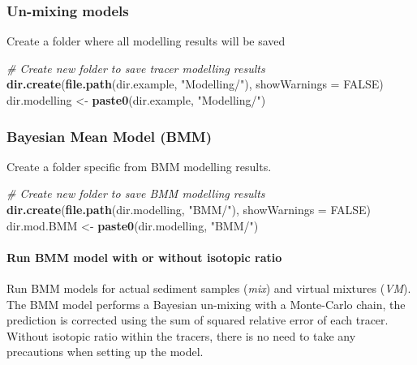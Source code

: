 \documentclass[
]{article}
\newenvironment{Shaded}{\begin{snugshade}}{\end{snugshade}}
\newcommand{\AttributeTok}[1]{\textcolor[rgb]{0.13,0.29,0.53}{#1}}
\newcommand{\CommentTok}[1]{\textcolor[rgb]{0.56,0.35,0.01}{\textit{#1}}}
\newcommand{\ConstantTok}[1]{\textcolor[rgb]{0.56,0.35,0.01}{#1}}
\newcommand{\FunctionTok}[1]{\textcolor[rgb]{0.13,0.29,0.53}{\textbf{#1}}}
\newcommand{\NormalTok}[1]{#1}
\newcommand{\OtherTok}[1]{\textcolor[rgb]{0.56,0.35,0.01}{#1}}
\newcommand{\StringTok}[1]{\textcolor[rgb]{0.31,0.60,0.02}{#1}}
\begin{document}
\hypertarget{un-mixing-models}{%
\subsubsection{Un-mixing models}\label{un-mixing-models}}

Create a folder where all modelling results will be saved

\begin{Shaded}
\begin{Highlighting}[]
\CommentTok{\# Create new folder to save tracer modelling results}
\FunctionTok{dir.create}\NormalTok{(}\FunctionTok{file.path}\NormalTok{(dir.example, }\StringTok{"Modelling/"}\NormalTok{), }\AttributeTok{showWarnings =} \ConstantTok{FALSE}\NormalTok{)}
\NormalTok{dir.modelling }\OtherTok{\textless{}{-}} \FunctionTok{paste0}\NormalTok{(dir.example, }\StringTok{"Modelling/"}\NormalTok{)}
\end{Highlighting}
\end{Shaded}

\hypertarget{bayesian-mean-model-bmm}{%
\subsubsection{Bayesian Mean Model
(BMM)}\label{bayesian-mean-model-bmm}}

Create a folder specific from BMM modelling results.

\begin{Shaded}
\begin{Highlighting}[]
\CommentTok{\# Create new folder to save BMM modelling results}
\FunctionTok{dir.create}\NormalTok{(}\FunctionTok{file.path}\NormalTok{(dir.modelling, }\StringTok{"BMM/"}\NormalTok{), }\AttributeTok{showWarnings =} \ConstantTok{FALSE}\NormalTok{)}
\NormalTok{dir.mod.BMM }\OtherTok{\textless{}{-}} \FunctionTok{paste0}\NormalTok{(dir.modelling, }\StringTok{"BMM/"}\NormalTok{)}
\end{Highlighting}
\end{Shaded}

\hypertarget{run-bmm-model-with-or-without-isotopic-ratio}{%
\paragraph{Run BMM model with or without isotopic
ratio}\label{run-bmm-model-with-or-without-isotopic-ratio}}

Run BMM models for actual sediment samples (\emph{mix}) and virtual
mixtures (\emph{VM}). The BMM model performs a Bayesian un-mixing with a
Monte-Carlo chain, the prediction is corrected using the sum of squared
relative error of each tracer. Without isotopic ratio within the
tracers, there is no need to take any precautions when setting up the
model.
\end{document}

